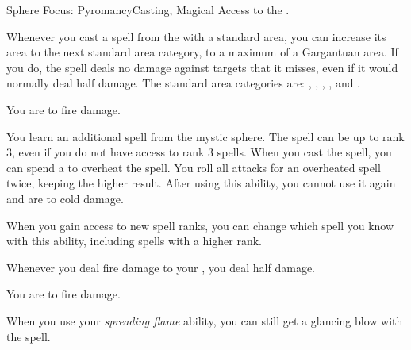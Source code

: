    \begin{magicalfeat}{Sphere Focus: Pyromancy}{Casting, Magical}
        \featpre Access to the  .

         Whenever you cast a spell from the   with a standard area, you can increase its area to the next standard area category, to a maximum of a Gargantuan area.
        If you do, the spell deals no damage against targets that it misses, even if it would normally deal half damage.
        The standard area categories are: \smallarea, \medarea, \largearea, \hugearea, and \gargarea.

         You are  to fire damage.

         You learn an additional spell from the  mystic sphere.
        The spell can be up to rank 3, even if you do not have access to rank 3 spells.
        When you cast the spell, you can spend a  to  overheat the spell.
        You roll all attacks for an overheated spell twice, keeping the higher result.
        After using this ability, you  cannot use it again and are \vulnerable to cold damage.

        When you gain access to new spell ranks, you can change which spell you know with this ability, including spells with a higher rank.

         Whenever you deal fire damage to your , you deal half damage.

         You are  to fire damage.

         When you use your \textit{spreading flame} ability, you can still get a glancing blow with the spell.
    \end{magicalfeat}

